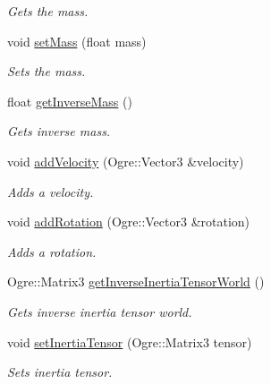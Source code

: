 \begin{DoxyCompactItemize}
\begin{DoxyCompactList}\small\item\em Gets the mass. \end{DoxyCompactList}\item 
void \hyperlink{class_objects_1_1_rigid_body_object_a05acd53aaf329569d1454eb12ad7e282}{set\-Mass} (float mass)
\begin{DoxyCompactList}\small\item\em Sets the mass. \end{DoxyCompactList}\item 
float \hyperlink{class_objects_1_1_rigid_body_object_a1b037499bc2350cb6f453c22cfb6866a}{get\-Inverse\-Mass} ()
\begin{DoxyCompactList}\small\item\em Gets inverse mass. \end{DoxyCompactList}\item 
void \hyperlink{class_objects_1_1_rigid_body_object_a07cbd5667c70936f0384fd29bd87f6cc}{add\-Velocity} (Ogre\-::\-Vector3 \&velocity)
\begin{DoxyCompactList}\small\item\em Adds a velocity. \end{DoxyCompactList}\item 
void \hyperlink{class_objects_1_1_rigid_body_object_aae35d039b1fc774135427918ac97b85b}{add\-Rotation} (Ogre\-::\-Vector3 \&rotation)
\begin{DoxyCompactList}\small\item\em Adds a rotation. \end{DoxyCompactList}\item 
Ogre\-::\-Matrix3 \hyperlink{class_objects_1_1_rigid_body_object_aa9834cc73862604017850623250fb66a}{get\-Inverse\-Inertia\-Tensor\-World} ()
\begin{DoxyCompactList}\small\item\em Gets inverse inertia tensor world. \end{DoxyCompactList}\item 
void \hyperlink{class_objects_1_1_rigid_body_object_a4b0ffccc0f8a9915f16baaf92c39bf25}{set\-Inertia\-Tensor} (Ogre\-::\-Matrix3 tensor)
\begin{DoxyCompactList}\small\item\em Sets inertia tensor. \end{DoxyCompactList}\end{DoxyCompactItemize}
